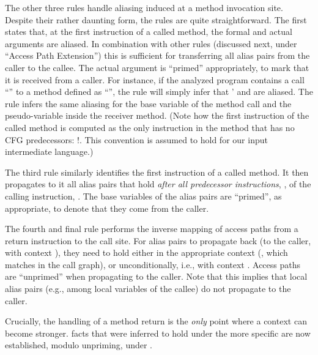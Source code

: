 The other three rules handle aliasing induced at a method invocation site. Despite their rather daunting form, the rules are quite straightforward. The first states that, at the first instruction of a called method, the formal and actual arguments are aliased. In combination with other rules (discussed next, under ``Access Path Extension'') this is sufficient for transferring all alias pairs from the caller to the callee. The actual argument is ``primed'' appropriately, to mark that it is received from a caller. For instance, if the analyzed program contains a call ``'' to a method defined as ``'', the rule will simply infer that ' and  are aliased. The rule infers the same aliasing for the base variable of the method call and the pseudo-variable  inside the receiver method. (Note how the first instruction of the called method is computed as the only instruction in the method that has no CFG predecessors: \dlforall{}  \dlThen{} !.  This convention is assumed to hold for our input intermediate language.)

The third rule similarly identifies the first instruction of a called method. It then propagates to it all alias pairs that hold \emph{after all predecessor instructions}, , of the calling instruction, . The base variables of the alias pairs are ``primed'', as appropriate, to denote that they come from the caller.

The fourth and final rule performs the inverse mapping of access paths from a return instruction to the call site. For alias pairs to propagate back (to the caller, with context ), they need to hold either in the appropriate context (, which matches  in the call graph), or unconditionally, i.e., with context \dlAll{}. Access paths are ``unprimed'' when propagating to the caller. Note that this implies that local alias pairs (e.g., among local variables of the callee) do not propagate to the caller.

Crucially, the handling of a method return is the \emph{only} point where a context can become stronger.  facts that were inferred to hold under the more specific  are now established, modulo unpriming, under .

